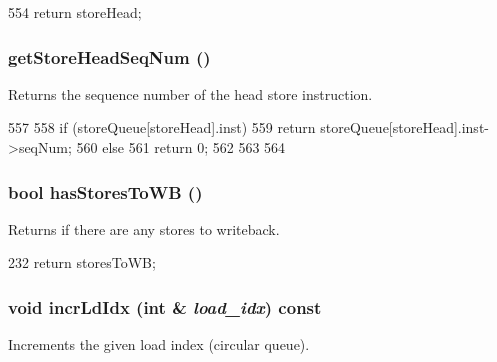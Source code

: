 \begin{DoxyCode}
554 { return storeHead; }
\end{DoxyCode}
\hypertarget{classLSQUnit_a1813b58ab7569d6aeefb5d4e235cceda}{
\subsubsection[{getStoreHeadSeqNum}]{ getStoreHeadSeqNum ()}}
\label{classLSQUnit_a1813b58ab7569d6aeefb5d4e235cceda}
Returns the sequence number of the head store instruction. 


\begin{DoxyCode}
557     {
558         if (storeQueue[storeHead].inst) {
559             return storeQueue[storeHead].inst->seqNum;
560         } else {
561             return 0;
562         }
563 
564     }
\end{DoxyCode}
\hypertarget{classLSQUnit_ad2e4b46255cfb53e85522adeed4e2089}{
\subsubsection[{hasStoresToWB}]{\setlength{\rightskip}{0pt plus 5cm}bool hasStoresToWB ()}}
\label{classLSQUnit_ad2e4b46255cfb53e85522adeed4e2089}
Returns if there are any stores to writeback. 


\begin{DoxyCode}
232 { return storesToWB; }
\end{DoxyCode}
\hypertarget{classLSQUnit_a129dcadec1d9a805428c1cfd14bcad5e}{
\subsubsection[{incrLdIdx}]{\setlength{\rightskip}{0pt plus 5cm}void incrLdIdx (int \& {\em load\_\-idx}) const}}
\label{classLSQUnit_a129dcadec1d9a805428c1cfd14bcad5e}
Increments the given load index (circular queue). 


